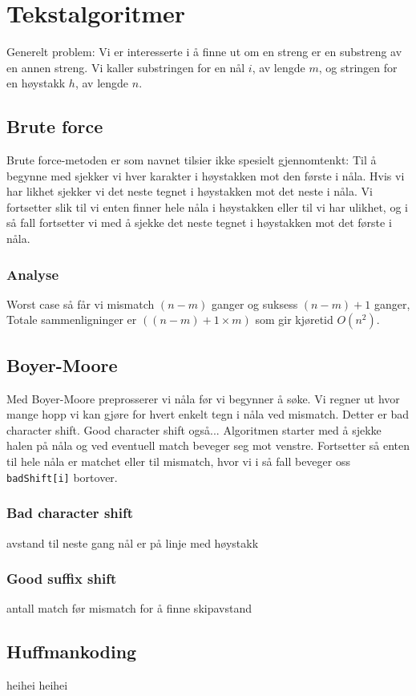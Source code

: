 \section{\color{red}Tekstalgoritmer}
	Generelt problem: Vi er interesserte i å finne ut om en streng er en substreng av en annen streng. Vi kaller substringen for en nål $i$, av lengde $m$, og stringen for en høystakk $h$, av lengde $n$.

\subsection{Brute force}
Brute force-metoden er som navnet tilsier ikke spesielt gjennomtenkt: Til å begynne med sjekker vi hver karakter i høystakken mot den første i nåla. Hvis vi har likhet sjekker vi det neste tegnet i høystakken mot det neste i nåla. Vi fortsetter slik til vi enten finner hele nåla i høystakken eller til vi har ulikhet, og i så fall fortsetter vi med å sjekke det neste tegnet i høystakken mot det første i nåla.

\subsubsection{Analyse}
Worst case så får vi mismatch $(n-m)$ ganger og suksess $(n-m)+1$ ganger, Totale sammenligninger er $((n-m)+1\times m)$ som gir kjøretid $O(n^2)$.

\subsection{\color{red}Boyer-Moore}
Med Boyer-Moore preprosserer vi nåla før vi begynner å søke. Vi regner ut hvor mange hopp vi kan gjøre for hvert enkelt tegn i nåla ved mismatch. Detter er bad character shift. Good character shift også... Algoritmen starter med å sjekke halen på nåla og ved eventuell match beveger seg mot venstre. Fortsetter så enten til hele nåla er matchet eller til mismatch, hvor vi i så fall beveger oss \verb|badShift[i]| bortover.

\subsubsection{\color{red}Bad character shift}
avstand til neste gang nål er på linje med høystakk
\subsubsection{\color{red}Good suffix shift}
antall match før mismatch for å finne skipavstand
\subsection{\color{red}Huffmankoding}
heihei
heihei
\label{huffman}